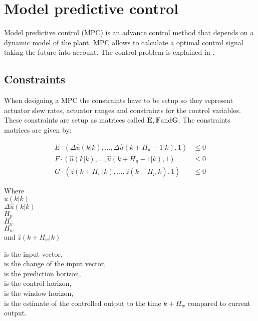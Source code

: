 \section{Model predictive control}

Model predictive control (MPC) is an advance control method that depends on a dynamic model of the plant. MPC allows to calculate a optimal control signal taking the future into account. The control problem is explained in .

\subsection{Constraints}

When designing a MPC the constraints have to be setup so they represent actuator slew rates, actuator ranges and constraints for the control variables. These constraints are setup as matrices called $\pmb{E}, \pmb{F} \text{and} \pmb{G}$. The constraints matrices are given by: 

\begin{align}
E \cdot (\Delta\hat u(k|k),...,\Delta\hat u(k+H_u-1|k),1) &\leq 0 \\
%
F \cdot (\hat u(k|k),...,\hat u(k+H_u-1|k),1) &\leq 0 \\
%
G \cdot (\hat z(k+H_w|k),...,\hat z(k+H_p|k),1) &\leq 0
\end{align}


 \begin{minipage}[t]{0.20\textwidth}
 Where\\
 \hspace*{8mm} $\hat u(k|k)$ \\
 \hspace*{8mm} $\Delta\hat u(k|k)$ \\
 \hspace*{8mm} $H_p$ \\
 \hspace*{8mm} $H_u$ \\
 \hspace*{8mm} $H_w$ \\
 and \hspace*{0.7mm} $\hat z(k+H_w|k)$	
 \end{minipage}
 \begin{minipage}[t]{0.68\textwidth}
 \vspace*{2mm}
 is the input vector, \\
 is the change of the input vector, \\
 is the prediction horizon,\\
 is the control horizon, \\
 is the window horizon, \\
 is the estimate of the controlled output to the time $k+H_w$ compared to current output.
 \end{minipage}

